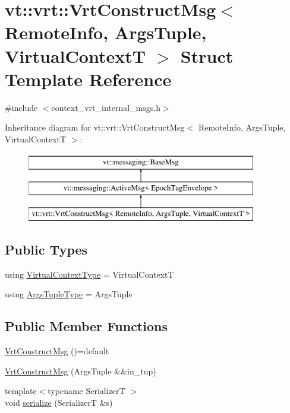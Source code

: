 \hypertarget{structvt_1_1vrt_1_1_vrt_construct_msg}{}\section{vt\+:\+:vrt\+:\+:Vrt\+Construct\+Msg$<$ Remote\+Info, Args\+Tuple, Virtual\+ContextT $>$ Struct Template Reference}
\label{structvt_1_1vrt_1_1_vrt_construct_msg}


{\ttfamily \#include $<$context\+\_\+vrt\+\_\+internal\+\_\+msgs.\+h$>$}

Inheritance diagram for vt\+:\+:vrt\+:\+:Vrt\+Construct\+Msg$<$ Remote\+Info, Args\+Tuple, Virtual\+ContextT $>$\+:\begin{figure}[H]
\begin{center}
\leavevmode
\includegraphics[height=3.000000cm]{structvt_1_1vrt_1_1_vrt_construct_msg}
\end{center}
\end{figure}
\subsection*{Public Types}
\begin{DoxyCompactItemize}
\item 
using \hyperlink{structvt_1_1vrt_1_1_vrt_construct_msg_aa5ff9ea61a1fcefeb0272fa0f5b6adc9}{Virtual\+Context\+Type} = Virtual\+ContextT
\item 
using \hyperlink{structvt_1_1vrt_1_1_vrt_construct_msg_a5ec9caa553a3004bce6a6ee151d15900}{Args\+Tuple\+Type} = Args\+Tuple
\end{DoxyCompactItemize}
\subsection*{Public Member Functions}
\begin{DoxyCompactItemize}
\item 
\hyperlink{structvt_1_1vrt_1_1_vrt_construct_msg_a5beda0ba3e8ea8c303cf95040c567862}{Vrt\+Construct\+Msg} ()=default
\item 
\hyperlink{structvt_1_1vrt_1_1_vrt_construct_msg_a30036d2df53914ad5d1b4e354d723040}{Vrt\+Construct\+Msg} (Args\+Tuple \&\&in\+\_\+tup)
\item 
{\footnotesize template$<$typename SerializerT $>$ }\\void \hyperlink{structvt_1_1vrt_1_1_vrt_construct_msg_af6ed1200b682487df4fc1d2faf86aa02}{serialize} (SerializerT \&s)
\end{DoxyCompactItemize}

